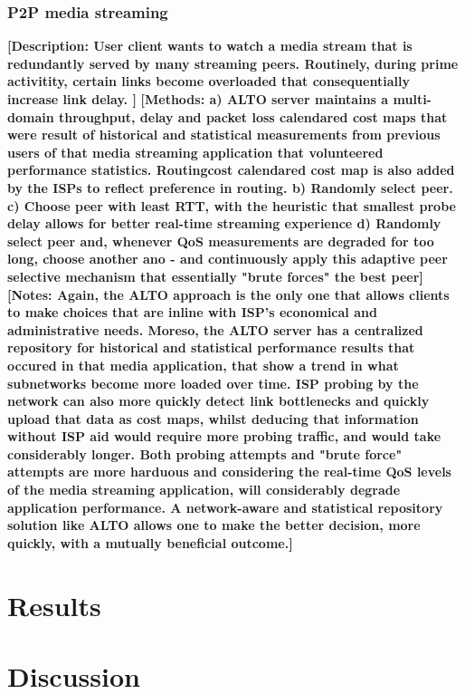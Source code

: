 \subsubsection{P2P media streaming}
\textbf{[Description: User client wants to watch a media stream that is redundantly served by many streaming peers. Routinely, during prime activitity, certain links become overloaded that consequentially increase link delay. ]}
\textbf{[Methods: a) ALTO server maintains a multi-domain throughput, delay and packet loss calendared cost maps that were result of historical and statistical measurements from previous users of that media streaming application that volunteered performance statistics. Routingcost calendared cost map is also added by the ISPs to reflect preference in routing. b) Randomly select peer. c) Choose peer with least RTT, with the heuristic that smallest probe delay allows for better real-time streaming experience d) Randomly select peer and, whenever QoS measurements are degraded for too long, choose another ano - and continuously apply this adaptive peer selective mechanism that essentially "brute forces" the best peer]}
\textbf{[Notes: Again, the ALTO approach is the only one that allows clients to make choices that are inline with ISP's economical and administrative needs. Moreso, the ALTO server has a centralized repository for historical and statistical performance results that occured in that media application, that show a trend in what subnetworks become more loaded over time. ISP probing by the network can also more quickly detect link bottlenecks and quickly upload that data as cost maps, whilst deducing that information without ISP aid would require more probing traffic, and would take considerably longer. Both probing attempts and "brute force" attempts are more harduous and considering the real-time QoS levels of the media streaming application, will considerably degrade application performance. A network-aware and statistical repository solution like ALTO allows one to make the better decision, more quickly, with a mutually beneficial outcome.]}

\section{Results}
\section{Discussion}

